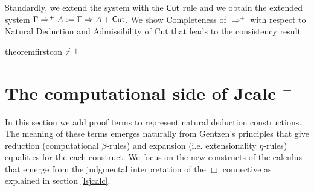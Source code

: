 			Standardly, we  extend the system with the ${\sf Cut}$ rule and we  obtain the extended system $\Gamma \Rightarrow^{+} A:= \Gamma\Rightarrow A + {\sf Cut}$. 
			We show Completeness of $\Rightarrow^{+}$ with respect to Natural Deduction and  Admissibility of Cut that leads to the consistency result
			\begin{theorem}{theorem}{firstcon}
				$\centernot{\vdash}\bot$
			\end{theorem}
			
			
			
			
			
			
			\section{The computational side of Jcalc $^{-}$}
			In this section we add proof terms to represent natural deduction constructions. The  meaning of these terms emerges naturally from Gentzen's principles that give reduction (computational $\beta$-rules) and expansion (i.e. extensionality $\eta$-rules) equalities for the each construct. We focus on the new constructs of the calculus that emerge from the judgmental interpretation of the $\Box$ connective as explained in 
			section \ref{lsjcalc}.
			
